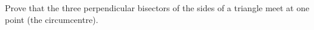 Prove that the three perpendicular bisectors of the sides of a triangle meet at one point (the circumcentre).

